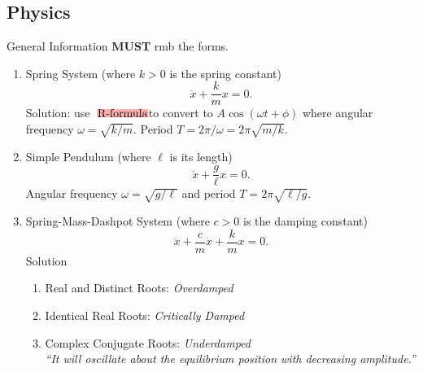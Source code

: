 \documentclass[oneside]{book}
\newcommand{\highlight}[2][red!50]{\mathpalette{\highlightwithstyle[#1]}{#2}}
\newcommand{\highlightwithstyle}[3][red!50]{
  \begingroup                         %
    \sbox0{$\mathsurround 0pt #2#3$}%
    \setlength{\fboxsep}{.5pt}        %
    \sbox2{\hspace{-.5pt}%
      \colorbox{#1}{\usebox0}%
    }%
    \dp2=\dp0 \ht2=\ht0 \wd2=\wd0     %
    \box2                             %
  \endgroup                           %
}
\begin{document}
\subsection{Physics}
\begin{stbox}{General Information}
  \textbf{MUST} rmb the forms.
  \begin{enumerate}
    \item Spring System (where \(k>0\) is the spring constant) 
    \[\ddot{x}+\frac{k}{m}x=0.\]
    Solution: use \(\highlight[red!30]{\text{R-formula}}\) to convert to \(A \cos(\omega t + \phi)\) where angular frequency \(\omega=\sqrt{k/m}\). Period \(T=2\pi/\omega=2\pi \sqrt{m/k}\).
    \item Simple Pendulum (where \(\ell\) is its length)
    \[\ddot{x}+\frac{g}{\ell}x=0.\]
    Angular frequency \(\omega=\sqrt{g/\ell}\) and period \(T=2\pi \sqrt{\ell/g}\).
    \item Spring-Mass-Dashpot System (where \(c>0\) is the damping constant)
    \[\ddot{x}+\frac{c}{m}\dot{x}+\frac{k}{m}x=0.\]
    Solution
    \begin{enumerate}
      \item Real and Distinct Roots: \emph{Overdamped}
      \item Identical Real Roots: \emph{Critically Damped}
      \item Complex Conjugate Roots: \emph{Underdamped}\\
      \emph{``It will oscillate about the equilibrium position with decreasing amplitude.''}
    \end{enumerate}
  \end{enumerate}
\end{stbox}
\begin{center}
  
\end{center}
\end{document}

